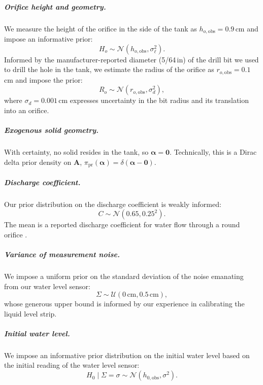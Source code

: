 \documentclass[openacc]{rsproca_new}%
\begin{document}
\vspace{-\baselineskip}
\subparagraph{Orifice height and geometry.} 
We measure the height of the orifice in the side of the tank as $h_{o, \text{obs}}=0.9$\,cm and impose an informative prior:
\begin{equation}
H_o \sim \mathcal{N}(h_{o, \text{obs}}, \sigma_\ell^2).
\end{equation}
Informed by the manufacturer-reported diameter (5/64\,in) of the drill bit we used to drill the hole in the tank, we estimate the radius of the orifice as $r_{o, \text{obs}}=0.1$\,cm and impose the prior:
\begin{equation}
R_o \sim \mathcal{N}(r_{o, \text{obs}}, \sigma_d^2), \label{eq:R_o_prior}
\end{equation}
where $\sigma_d= 0.001$\,cm expresses uncertainty in the bit radius and its translation into an orifice.

\vspace{-\baselineskip}
\subparagraph{Exogenous solid geometry.}
With certainty, no solid resides in the tank, so $\boldsymbol \alpha=\mathbf{0}$. Technically, this is a Dirac delta prior density on $\mathbf{A}$, $\pi_{\text{pr}}(\boldsymbol \alpha)=\delta(\boldsymbol \alpha - \mathbf{0})$. 




\vspace{-\baselineskip}
\subparagraph{Discharge coefficient.} 
Our prior distribution on the discharge coefficient is weakly informed:
\begin{equation}
	C \sim \mathcal{N}(0.65, 0.25^2).
\end{equation} The mean is a reported discharge coefficient for water flow through a round orifice \cite{hicks2014determining}. 

\vspace{-\baselineskip}
\subparagraph{Variance of measurement noise.} 
We impose a uniform prior on the standard deviation of the noise emanating from our water level sensor:
\begin{equation}
\Sigma \sim \mathcal{U}(0\,\text{cm}, 0.5\,\text{cm}),
\end{equation} whose generous upper bound is informed by our experience in calibrating the liquid level strip. 

\vspace{-\baselineskip}
\subparagraph{Initial water level.} We impose an informative prior distribution on the initial water level based on the initial reading of the water level sensor:
\begin{equation}
	H_0 \mid \Sigma=\sigma \sim \mathcal{N}(h_{0, \text{obs}}, \sigma^2).
\end{equation} 
\end{document}
